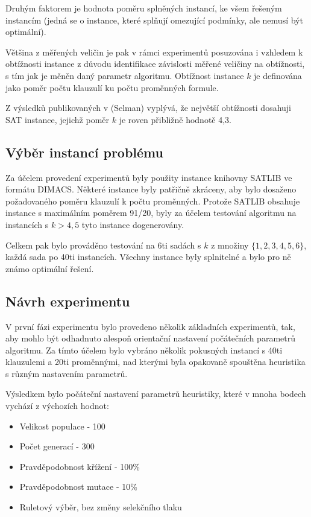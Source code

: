 \documentclass[12pt,oneside,a4paper]{article}
\begin{document}
Druhým faktorem je hodnota poměru splněných instancí, ke všem řešeným instancím (jedná se o instance, které splňují omezující podmínky, ale nemusí být optimální).

Většina z měřených veličin je pak v rámci experimentů posuzována i vzhledem k obtížnosti instance z důvodu identifikace závislosti měřené veličiny na obtížnosti, s tím jak je měněn daný parametr algoritmu. Obtížnost instance $k$ je definována jako poměr počtu klauzulí ku počtu proměnných formule.

Z výsledků publikovaných v (Selman) vyplývá, že největší obtížnosti dosahuji SAT instance, jejichž poměr $k$ je roven přibližně hodnotě 4,3.


\subsection{Výběr instancí problému}

Za účelem provedení experimentů byly použity instance knihovny SATLIB ve formátu DIMACS. Některé instance byly patřičně zkráceny, aby bylo dosaženo požadovaného poměru klauzulí k počtu proměnných. Protože SATLIB obsahuje instance s maximálním poměrem 91/20, byly za účelem testování algoritmu na instancích s $k>4,5$ tyto instance dogenerovány.

Celkem pak bylo prováděno testování na 6ti sadách s $k$ z množiny $\{1,2,3,4,5,6\}$, každá sada po 40ti instancích. Všechny instance byly splnitelné a bylo pro ně známo optimální řešení.


\subsection{Návrh experimentu}

V první fázi experimentu bylo provedeno několik základních experimentů, tak, aby mohlo být odhadnuto alespoň orientační nastavení počátečních parametrů algoritmu. Za tímto účelem bylo vybráno několik pokusných instancí s 40ti klauzulemi a 20ti proměnnými, nad kterými byla opakovaně spouštěna heuristika s různým nastavením parametrů.

Výsledkem bylo počáteční nastavení parametrů heuristiky, které v mnoha bodech vychází z výchozích hodnot:
\begin{itemize}
\item Velikost populace - 100
\item Počet generací - 300
\item Pravděpodobnost křížení - 100\%
\item Pravděpodobnost mutace - 10\%
\item Ruletový výběr, bez změny selekčního tlaku
\end{itemize}
\end{document}
